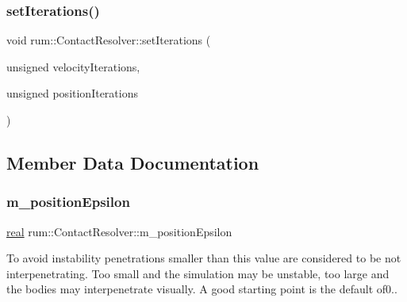\mbox{\label{classrum_1_1_contact_resolver_a2dd2bf231348dc011449f43e71087182}} 
\subsubsection{\texorpdfstring{set\+Iterations()}{setIterations()}\hspace{0.1cm}{\footnotesize\ttfamily [2/2]}}
{\footnotesize\ttfamily void rum\+::\+Contact\+Resolver\+::set\+Iterations (\begin{DoxyParamCaption}\item[{unsigned}]{velocity\+Iterations,  }\item[{unsigned}]{position\+Iterations }\end{DoxyParamCaption})}



\subsection{Member Data Documentation}
\mbox{\label{classrum_1_1_contact_resolver_a7de7422d90c874c9b3852fb98612c6ce}} 
\subsubsection{\texorpdfstring{m\+\_\+position\+Epsilon}{m\_positionEpsilon}}
{\footnotesize\ttfamily \hyperlink{namespacerum_a7e8cca23573d5eaead0f138cbaa4862c}{real} rum\+::\+Contact\+Resolver\+::m\+\_\+position\+Epsilon\hspace{0.3cm}{\ttfamily [protected]}}

To avoid instability penetrations smaller than this value are considered to be not interpenetrating. Too small and the simulation may be unstable, too large and the bodies may interpenetrate visually. A good starting point is the default of0.. \mbox{\label{classrum_1_1_contact_resolver_adb8b6bf74fdb76f502f412b947a6b6b9}} 

